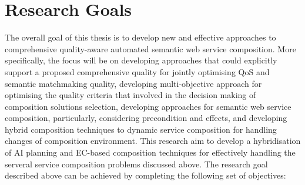 






\section{Research Goals}
The overall goal of this thesis is to develop new and effective approaches to comprehensive quality-aware automated semantic web service composition. More specifically, the focus will be on developing approaches that could explicitly support a proposed comprehensive quality for jointly optimising QoS and semantic matchmaking quality, developing multi-objective approach for optimising the quality criteria that involved in the decision making of composition solutions selection, developing approaches for semantic web service composition, particularly, considering precondition and effects, and developing hybrid composition techniques to dynamic service composition for handling changes of composition environment. This research aim to develop a hybridisation of AI planning and EC-based composition techniques for effectively handling the serveral service composition problems discussed above. The research goal described above can be achieved by completing the following set of objectives:


